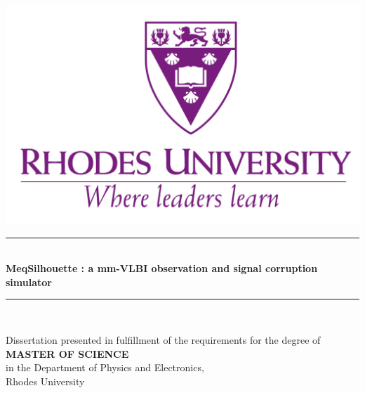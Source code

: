 \begin{titlepage}

\newcommand{\HRule}{\rule{\linewidth}{0.5mm}} %

\center %
 

\includegraphics[width=0.4\columnwidth]{Images/Rhode.png}\\[1cm] %



\HRule \\[0.4cm]
{ \huge \bfseries MeqSilhouette : a mm-VLBI observation and signal corruption simulator}\\[0.4cm]
\HRule \\[1.5cm]


\begin{center}
 {\large Dissertation presented in fulfillment of the requirements for the degree of} \\
 {\large \textbf{MASTER OF SCIENCE}} \\
 {\large in the Department of Physics and Electronics,} \\
 {\large Rhodes University}
\end{center}
\vspace{0.02\textheight}



\end{titlepage}
